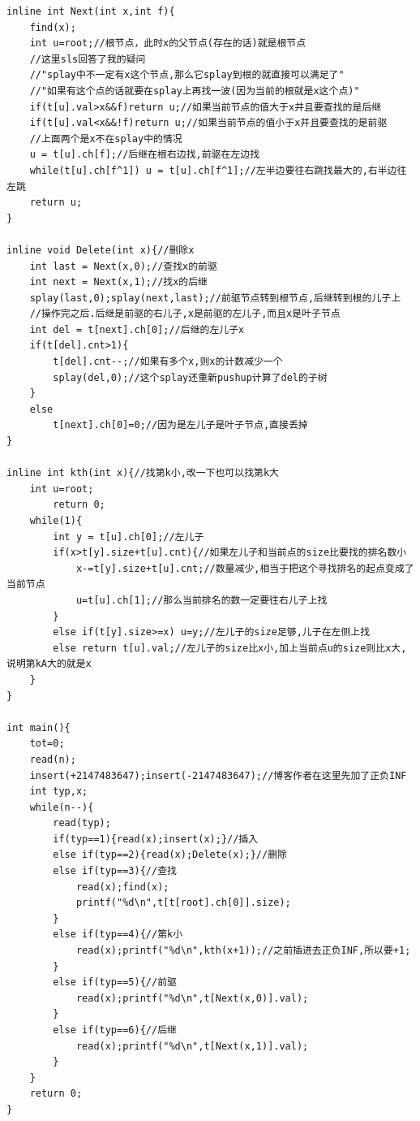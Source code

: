 \documentclass[a4]{ctexart}
\begin{document}
\begin{lstlisting}
inline int Next(int x,int f){
	find(x); 
	int u=root;//根节点，此时x的父节点(存在的话)就是根节点 
	//这里sls回答了我的疑问
	//"splay中不一定有x这个节点,那么它splay到根的就直接可以满足了"
	//"如果有这个点的话就要在splay上再找一波(因为当前的根就是x这个点)"
	if(t[u].val>x&&f)return u;//如果当前节点的值大于x并且要查找的是后继
    if(t[u].val<x&&!f)return u;//如果当前节点的值小于x并且要查找的是前驱 
    //上面两个是x不在splay中的情况
	u = t[u].ch[f];//后继在根右边找,前驱在左边找
	while(t[u].ch[f^1]) u = t[u].ch[f^1];//左半边要往右跳找最大的,右半边往左跳 
	return u;
}

inline void Delete(int x){//删除x 
	int last = Next(x,0);//查找x的前驱
	int next = Next(x,1);//找x的后继
	splay(last,0);splay(next,last);//前驱节点转到根节点,后继转到根的儿子上
	//操作完之后.后继是前驱的右儿子,x是前驱的左儿子,而且x是叶子节点 
	int del = t[next].ch[0];//后继的左儿子x
	if(t[del].cnt>1){
		t[del].cnt--;//如果有多个x,则x的计数减少一个
		splay(del,0);//这个splay还重新pushup计算了del的子树
	}
	else
		t[next].ch[0]=0;//因为是左儿子是叶子节点,直接丢掉 
}

inline int kth(int x){//找第k小,改一下也可以找第k大 
	int u=root;
		return 0; 
	while(1){
		int y = t[u].ch[0];//左儿子
		if(x>t[y].size+t[u].cnt){//如果左儿子和当前点的size比要找的排名数小 
			x-=t[y].size+t[u].cnt;//数量减少,相当于把这个寻找排名的起点变成了当前节点 
			u=t[u].ch[1];//那么当前排名的数一定要往右儿子上找 
		}
		else if(t[y].size>=x) u=y;//左儿子的size足够,儿子在左侧上找 
		else return t[u].val;//左儿子的size比x小,加上当前点u的size则比x大,说明第kA大的就是x 
	}
} 

int main(){
	tot=0;
	read(n);
    insert(+2147483647);insert(-2147483647);//博客作者在这里先加了正负INF
    int typ,x;
    while(n--){
        read(typ);
        if(typ==1){read(x);insert(x);}//插入 
        else if(typ==2){read(x);Delete(x);}//删除 
        else if(typ==3){//查找 
			read(x);find(x);
            printf("%d\n",t[t[root].ch[0]].size);
        }
        else if(typ==4){//第k小 
            read(x);printf("%d\n",kth(x+1));//之前插进去正负INF,所以要+1; 
        }
        else if(typ==5){//前驱
            read(x);printf("%d\n",t[Next(x,0)].val);
        }
        else if(typ==6){//后继 
            read(x);printf("%d\n",t[Next(x,1)].val);
        }
    }
    return 0;
}
\end{lstlisting}
\end{document}
